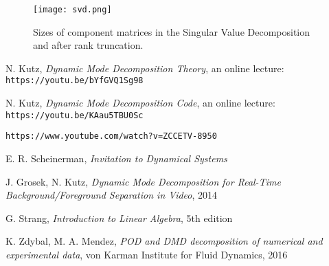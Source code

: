 \documentclass[10pt,twocolumn]{article}
\begin{document}
\begin{figure}[H]
\centering\texttt{[image: svd.png]}
\caption{Sizes of component matrices in the Singular Value Decomposition and after rank truncation.}
\label{fig:linear_system}
\end{figure}


\thebibliography{}



 N. Kutz, \textit{Dynamic Mode Decomposition Theory}, an online lecture: \verb|https://youtu.be/bYfGVQ1Sg98| \label{bib:kutz_1}

 N. Kutz, \textit{Dynamic Mode Decomposition Code}, an online lecture: \verb|https://youtu.be/KAau5TBU0Sc| \label{bib:kutz_2}

 \verb|https://www.youtube.com/watch?v=ZCCETV-8950| \label{bib:andymation}

 E. R. Scheinerman, \textit{Invitation to Dynamical Systems}

 J. Grosek, N. Kutz, \textit{Dynamic Mode Decomposition for Real-Time Background/Foreground Separation in Video}, 2014

 G. Strang, \textit{Introduction to Linear Algebra}, 5th edition

 K. Zdybal, M. A. Mendez, \textit{POD and DMD decomposition of numerical and experimental data}, von Karman Institute for Fluid Dynamics, 2016
\end{document}
